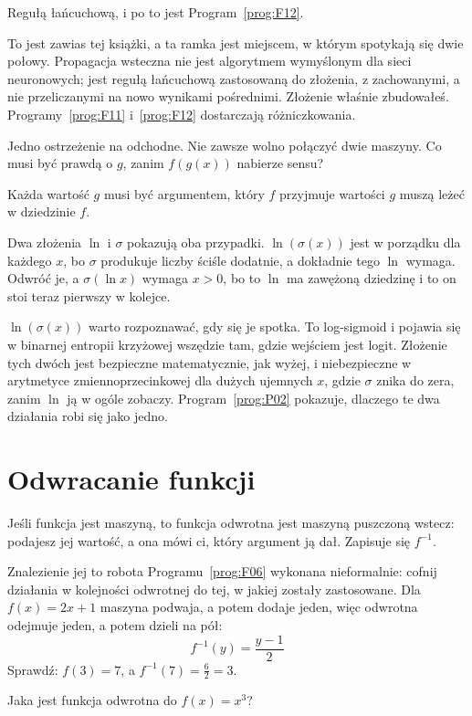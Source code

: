 \begin{fr}
\begin{ansblock}
Regułą łańcuchową, i po to jest Program~\ref{prog:F12}.
\end{ansblock}

To jest zawias tej książki, a ta ramka jest miejscem, w którym spotykają się
dwie połowy. Propagacja wsteczna nie jest algorytmem wymyślonym dla sieci
neuronowych; jest regułą łańcuchową zastosowaną do złożenia, z zachowanymi, a
nie przeliczanymi na nowo wynikami pośrednimi. Złożenie właśnie zbudowałeś.
Programy~\ref{prog:F11} i~\ref{prog:F12} dostarczają różniczkowania.

Jedno ostrzeżenie na odchodne. Nie zawsze wolno połączyć dwie maszyny. Co musi
być prawdą o $g$, zanim $f(g(x))$ nabierze sensu?
\nextframe
\end{fr}

\begin{fr}
\begin{ansblock}
Każda wartość $g$ musi być argumentem, który $f$ przyjmuje \dash{} wartości $g$
muszą leżeć w dziedzinie $f$.
\end{ansblock}

Dwa złożenia $\ln$ i $\sigma$ pokazują oba przypadki. $\ln(\sigma(x))$ jest w
porządku dla każdego $x$, bo $\sigma$ produkuje liczby ściśle dodatnie, a
dokładnie tego $\ln$ wymaga. Odwróć je, a $\sigma(\ln x)$ wymaga $x > 0$, bo to
$\ln$ ma zawężoną dziedzinę i to on stoi teraz pierwszy w kolejce.

\begin{note}
$\ln(\sigma(x))$ warto rozpoznawać, gdy się je spotka. To log-sigmoid i
pojawia się w binarnej entropii krzyżowej wszędzie tam, gdzie wejściem jest
logit. Złożenie tych dwóch jest bezpieczne matematycznie, jak wyżej, i
niebezpieczne w arytmetyce
zmiennoprzecinkowej dla dużych ujemnych $x$, gdzie $\sigma$ znika do zera,
zanim $\ln$ ją w ogóle zobaczy. Program~\ref{prog:P02} pokazuje, dlaczego te
dwa działania robi się jako jedno.
\end{note}
\end{fr}

\section{Odwracanie funkcji}
\label{sec:F05-inverse}

\begin{fr}
Jeśli funkcja jest maszyną, to funkcja odwrotna jest maszyną puszczoną wstecz:
podajesz jej wartość, a ona mówi ci, który argument ją dał. Zapisuje się
$f^{-1}$.

Znalezienie jej to robota Programu~\ref{prog:F06} wykonana nieformalnie: cofnij
działania w kolejności odwrotnej do tej, w jakiej zostały zastosowane. Dla
$f(x) = 2x + 1$ maszyna podwaja, a potem dodaje jeden, więc odwrotna odejmuje
jeden, a potem dzieli na pół:
\[ f^{-1}(y) = \frac{y - 1}{2} \]
Sprawdź: $f(3) = 7$, a $f^{-1}(7) = \frac{6}{2} = 3$.

Jaka jest funkcja odwrotna do $f(x) = x^{3}$?
\nextframe
\end{fr}

